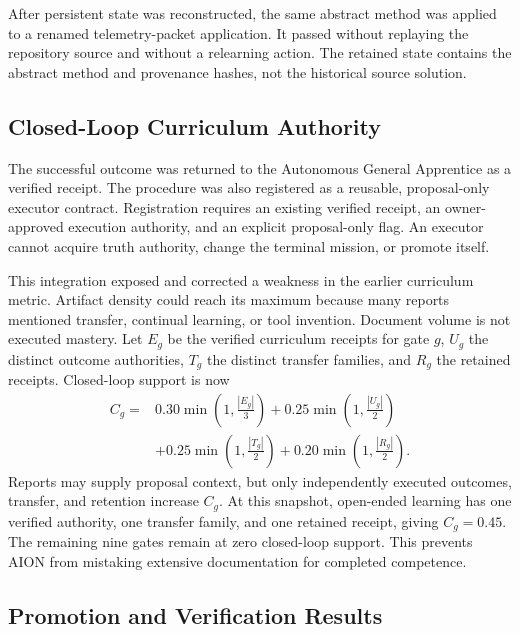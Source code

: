 After persistent state was reconstructed, the same abstract method was applied
to a renamed telemetry-packet application.  It passed without replaying the
repository source and without a relearning action.  The retained state contains
the abstract method and provenance hashes, not the historical source solution.

\subsection{Closed-Loop Curriculum Authority}
\label{subsec:closed-loop-curriculum-authority}

The successful outcome was returned to the Autonomous General Apprentice as a
verified  receipt.  The procedure was also
registered as a reusable, proposal-only executor contract.  Registration
requires an existing verified receipt, an owner-approved execution authority,
and an explicit proposal-only flag.  An executor cannot acquire truth authority,
change the terminal mission, or promote itself.

This integration exposed and corrected a weakness in the earlier curriculum
metric.  Artifact density could reach its maximum because many reports
mentioned transfer, continual learning, or tool invention.  Document volume is
not executed mastery.  Let $E_g$ be the verified curriculum receipts for gate
$g$, $U_g$ the distinct outcome authorities, $T_g$ the distinct transfer
families, and $R_g$ the retained receipts.  Closed-loop support is now
\begin{equation}
\begin{aligned}
C_g={}&0.30\min\!\left(1,\frac{|E_g|}{3}\right)
+0.25\min\!\left(1,\frac{|U_g|}{2}\right) \\
&+0.25\min\!\left(1,\frac{|T_g|}{2}\right)
+0.20\min\!\left(1,\frac{|R_g|}{2}\right).
\end{aligned}
\label{eq:closed-loop-apprenticeship-support}
\end{equation}
Reports may supply proposal context, but only independently executed outcomes,
transfer, and retention increase $C_g$.  At this snapshot, open-ended learning
has one verified authority, one transfer family, and one retained receipt,
giving $C_g=0.45$.  The remaining nine gates remain at zero closed-loop support.
This prevents AION from mistaking extensive documentation for completed
competence.

\subsection{Promotion and Verification Results}
\label{subsec:general-apprenticeship-executor-results}

